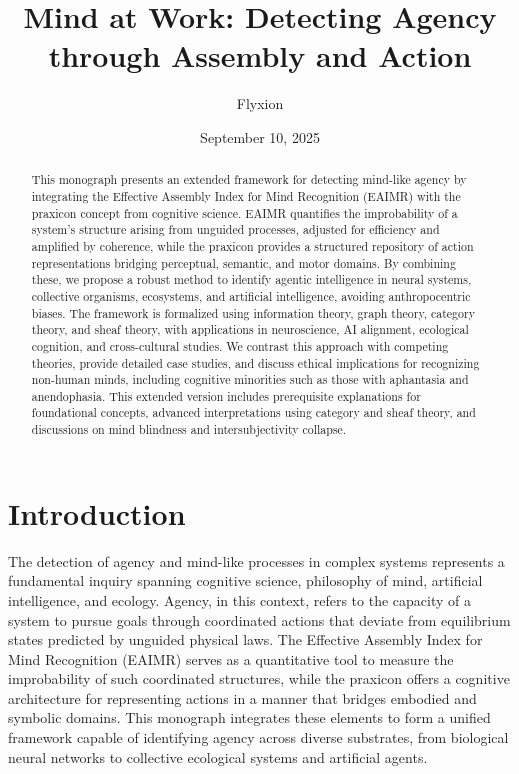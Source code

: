 \documentclass{article}
\title{Mind at Work: Detecting Agency through Assembly and Action}
\author{Flyxion}
\date{September 10, 2025}
\begin{document}
\maketitle

\begin{abstract}
This monograph presents an extended framework for detecting mind-like agency by integrating the Effective Assembly Index for Mind Recognition (EAIMR) with the praxicon concept from cognitive science. EAIMR quantifies the improbability of a system’s structure arising from unguided processes, adjusted for efficiency and amplified by coherence, while the praxicon provides a structured repository of action representations bridging perceptual, semantic, and motor domains. By combining these, we propose a robust method to identify agentic intelligence in neural systems, collective organisms, ecosystems, and artificial intelligence, avoiding anthropocentric biases. The framework is formalized using information theory, graph theory, category theory, and sheaf theory, with applications in neuroscience, AI alignment, ecological cognition, and cross-cultural studies. We contrast this approach with competing theories, provide detailed case studies, and discuss ethical implications for recognizing non-human minds, including cognitive minorities such as those with aphantasia and anendophasia. This extended version includes prerequisite explanations for foundational concepts, advanced interpretations using category and sheaf theory, and discussions on mind blindness and intersubjectivity collapse.
\end{abstract}

\section{Introduction}
\label{sec:introduction}

The detection of agency and mind-like processes in complex systems represents a fundamental inquiry spanning cognitive science, philosophy of mind, artificial intelligence, and ecology. Agency, in this context, refers to the capacity of a system to pursue goals through coordinated actions that deviate from equilibrium states predicted by unguided physical laws. The Effective Assembly Index for Mind Recognition (EAIMR) serves as a quantitative tool to measure the improbability of such coordinated structures, while the praxicon offers a cognitive architecture for representing actions in a manner that bridges embodied and symbolic domains. This monograph integrates these elements to form a unified framework capable of identifying agency across diverse substrates, from biological neural networks to collective ecological systems and artificial agents.
\end{document}
